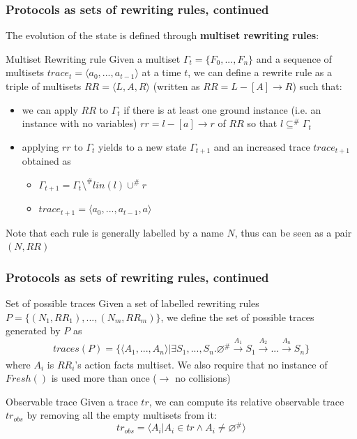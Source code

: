 \documentclass[aspectratio=169,t,xcolor=table]{beamer}
\begin{document}
\begin{frame}
    \frametitle{Protocols as sets of rewriting rules, continued}

    The evolution of the state is defined through \textbf{multiset rewriting rules}:
    
    \begin{block}{Multiset Rewriting rule}
        Given a multiset $\Gamma_t = \{ F_0, ..., F_n \}$ and a sequence of multisets $trace_t = \langle a_0, ..., a_{t-1} \rangle$ at a time $t$, we can define a rewrite rule as a triple of multisets $RR = \langle L, A, R \rangle$ (written as $RR= L -[ A ] \rightarrow R$) such that:
        \begin{itemize}
            \item we can apply $RR$ to $\Gamma_t$ if there is at least one ground instance (i.e. an instance with no variables) $rr = l -[ a ] \rightarrow r$ of $RR$ so that $l \subseteq^{\#} \Gamma_t$
            \item applying $rr$ to $\Gamma_t$ yields to a new state $\Gamma_{t+1}$ and an increased trace $trace_{t+1}$ obtained as
            \begin{itemize}
                \item $\Gamma_{t+1} = \Gamma_t \setminus^{\#} lin(l) \cup^{\#} r$
                \item $trace_{t+1} = \langle a_0, ..., a_{t-1}, a \rangle$
            \end{itemize}
        \end{itemize}
    \end{block}

    Note that each rule is generally labelled by a name $N$, thus can be seen as a pair $(N, RR)$
\end{frame}

\begin{frame}
    \frametitle{Protocols as sets of rewriting rules, continued}
    
    \begin{block}{Set of possible traces}
        Given a set of labelled rewriting rules $P = \{(N_1,RR_1),...,(N_m,RR_m)\}$, we define the set of possible traces generated by $P$ as
        $$traces(P) = \{ \langle A_1,...,A_n \rangle | \exists S_1,...,S_n . \varnothing ^{\#} \xrightarrow[]{A_1} S_1 \xrightarrow[]{A_2} ... \xrightarrow[]{A_n} S_n\}$$
        where $A_i$ is $RR_i$'s action facts multiset.
        We also require that no instance of $Fresh()$ is used more than once ($\to$ no collisions)
    \end{block}

    \begin{block}{Observable trace}
        Given a trace $tr$, we can compute its relative observable trace $tr_{obs}$ by removing all the empty multisets from it:
        $$tr_{obs} = \langle A_i | A_i \in tr \land A_i \neq \varnothing^{\#} \rangle$$
    \end{block}
\end{frame}
\end{document}
